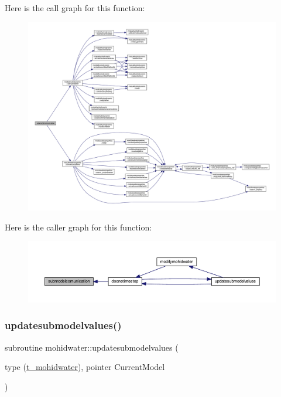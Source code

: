 Here is the call graph for this function\+:\nopagebreak
\begin{figure}[H]
\begin{center}
\leavevmode
\includegraphics[width=350pt]{_main_8_f90_a7e852b1ed4379c79f70b17003d08f3c5_cgraph}
\end{center}
\end{figure}
Here is the caller graph for this function\+:\nopagebreak
\begin{figure}[H]
\begin{center}
\leavevmode
\includegraphics[width=350pt]{_main_8_f90_a7e852b1ed4379c79f70b17003d08f3c5_icgraph}
\end{center}
\end{figure}
\mbox{\label{_main_8_f90_a4c5ecbd810307fa557d4b4e6719c7fd1}} 
\subsubsection{\texorpdfstring{updatesubmodelvalues()}{updatesubmodelvalues()}}
{\footnotesize\ttfamily subroutine mohidwater\+::updatesubmodelvalues (\begin{DoxyParamCaption}\item[{type (\mbox{\hyperlink{structt__mohidwater}{t\+\_\+mohidwater}}), pointer}]{Current\+Model }\end{DoxyParamCaption})}

